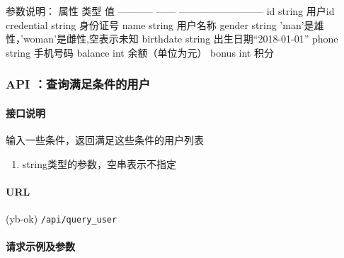 \documentclass[]{article}
\providecommand{\tightlist}{%
  \setlength{\itemsep}{0pt}\setlength{\parskip}{0pt}}
\let\oldparagraph\paragraph
\renewcommand{\paragraph}[1]{\oldparagraph{#1}\mbox{}}
\begin{document}
参数说明： \textbar{} 属性 \textbar{} 类型 \textbar{} 值 \textbar{}
\textbar{} ----------- \textbar{} ------ \textbar{}
-------------------------- \textbar{} \textbar{} id \textbar{} string
\textbar{} 用户id \textbar{} \textbar{} credential \textbar{} string
\textbar{} 身份证号 \textbar{} \textbar{} name \textbar{} string
\textbar{} 用户名称 \textbar{} \textbar{} gender \textbar{} string
\textbar{} 'man'是雄性，'woman'是雌性,空表示未知 \textbar{}
\textbar{}birthdate \textbar{} string \textbar{} 出生日期``2018-01-01''
\textbar{} \textbar{} phone \textbar{} string \textbar{} 手机号码
\textbar{} \textbar{} balance \textbar{} int \textbar{} 余额（单位为元）
\textbar{} \textbar{} bonus \textbar{} int \textbar{} 积分 \textbar{}

\hypertarget{api-ux67e5ux8be2ux6ee1ux8db3ux6761ux4ef6ux7684ux7528ux6237}{%
\subsubsection{API
：查询满足条件的用户}\label{api-ux67e5ux8be2ux6ee1ux8db3ux6761ux4ef6ux7684ux7528ux6237}}

\hypertarget{ux63a5ux53e3ux8bf4ux660e}{%
\paragraph{接口说明}\label{ux63a5ux53e3ux8bf4ux660e}}

输入一些条件，返回满足这些条件的用户列表

\begin{enumerate}
\def\labelenumi{\arabic{enumi}.}
\tightlist
\item
  string类型的参数，空串表示不指定
\end{enumerate}

\hypertarget{url-8}{%
\paragraph{URL}\label{url-8}}

(yb-ok) \texttt{/api/query\_user}

\hypertarget{ux8bf7ux6c42ux793aux4f8bux53caux53c2ux6570-6}{%
\paragraph{请求示例及参数}\label{ux8bf7ux6c42ux793aux4f8bux53caux53c2ux6570-6}}

\begin{Shaded}
\begin{Highlighting}[]
\FunctionTok{\{}
     \FunctionTok{:} \FunctionTok{,}
    \ErrorTok{//}  
\FunctionTok{\}}
\end{Highlighting}
\end{Shaded}
\end{document}
